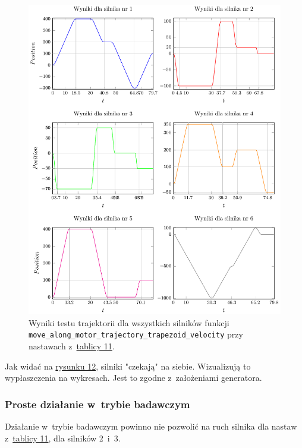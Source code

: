 \documentclass[a4paper, 12pt]{article}
\begin{document}
	\begin{figure}[H]
		\centering
		\includegraphics[scale=1.1]{raport_graphs/simpMTVall.pdf}
		\caption{Wyniki testu trajektorii dla wszystkich silników funkcji \texttt{move\_along\_motor\_trajectory\_trapezoid\_velocity} przy nastawach z~\hyperref[tab:setup5]{tablicy 11}.}
		\label{fig:simpMTVall}
	\end{figure}
	
	Jak widać na \hyperref[fig:simpMTVall]{rysunku 12}, silniki "czekają" na siebie. Wizualizują to wypłaszczenia na wykresach. Jest to zgodne z~założeniami generatora. 
	
	\subsubsection{Proste działanie w~trybie badawczym}
	Działanie w~trybie badawczym powinno nie pozwolić na ruch silnika dla nastaw z~\hyperref[tab:setup5]{tablicy 11}, dla silników 2~i~3. 
	
\end{document}
